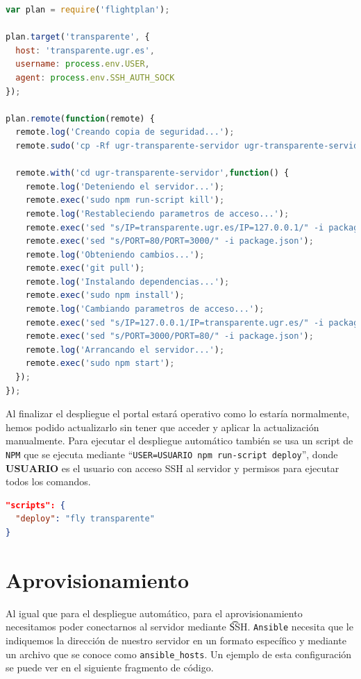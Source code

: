 \begin{lstlisting}[language=javascript,caption={Archivo flightplan.js},label={lst:testjs}]
var plan = require('flightplan');

plan.target('transparente', {
  host: 'transparente.ugr.es',
  username: process.env.USER,
  agent: process.env.SSH_AUTH_SOCK
});

plan.remote(function(remote) {
  remote.log('Creando copia de seguridad...');
  remote.sudo('cp -Rf ugr-transparente-servidor ugr-transparente-servidor.bak', {user: process.env.USER});

  remote.with('cd ugr-transparente-servidor',function() {
    remote.log('Deteniendo el servidor...');
    remote.exec('sudo npm run-script kill');
    remote.log('Restableciendo parametros de acceso...');
    remote.exec('sed "s/IP=transparente.ugr.es/IP=127.0.0.1/" -i package.json');
    remote.exec('sed "s/PORT=80/PORT=3000/" -i package.json');
    remote.log('Obteniendo cambios...');
    remote.exec('git pull');
    remote.log('Instalando dependencias...');
    remote.exec('sudo npm install');
    remote.log('Cambiando parametros de acceso...');
    remote.exec('sed "s/IP=127.0.0.1/IP=transparente.ugr.es/" -i package.json');
    remote.exec('sed "s/PORT=3000/PORT=80/" -i package.json');
    remote.log('Arrancando el servidor...');
    remote.exec('sudo npm start');
  });
});
\end{lstlisting}

Al finalizar el despliegue el portal estará operativo como lo estaría normalmente, hemos podido actualizarlo sin tener que acceder y aplicar la actualización manualmente. Para ejecutar el despliegue automático también se usa un script de {\tt NPM} que se ejecuta mediante ``{\tt USER=USUARIO npm run-script deploy}'', donde \textbf{USUARIO} es el usuario con acceso SSH al servidor y permisos para ejecutar todos los comandos.

\begin{lstlisting}[language=json,caption={Scripts de despliegue automático},label={lst:deploy}]
"scripts": {
  "deploy": "fly transparente"
}
\end{lstlisting}

\section{Aprovisionamiento}

Al igual que para el despliegue automático, para el aprovisionamiento necesitamos poder conectarnos al servidor mediante {\t SSH}. {\tt Ansible} necesita que le indiquemos la dirección de nuestro servidor en un formato específico y mediante un archivo que se conoce como {\tt ansible\_hosts}. Un ejemplo de esta configuración se puede ver en el siguiente fragmento de código.

